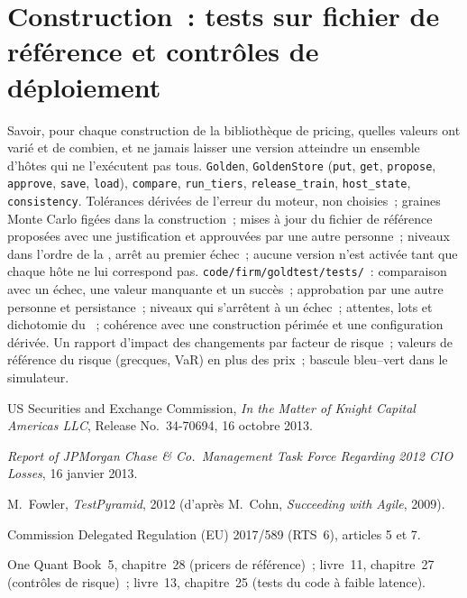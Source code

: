 \section{Construction~: tests sur fichier de référence et contrôles de déploiement}\label{bld:pl:testing-and-continuous-delivery:goldtest}

\begin{build}
 Savoir, pour chaque construction de la bibliothèque de pricing, quelles valeurs ont varié et de combien, et ne jamais laisser une version atteindre un
ensemble d'hôtes qui ne l'exécutent pas tous.
 \texttt{Golden}, \texttt{GoldenStore} (\texttt{put}, \texttt{get}, \texttt{propose}, \texttt{approve}, \texttt{save},
\texttt{load}), \texttt{compare}, \texttt{run\_tiers}, \texttt{release\_train}, \texttt{host\_state}, \texttt{consistency}.
 Tolérances dérivées de l'erreur du moteur, non choisies~; graines Monte Carlo figées dans la construction~; mises à jour du fichier de référence proposées avec une justification
et approuvées par une autre personne~; niveaux dans l'ordre de la , arrêt au premier échec~; aucune version n'est activée tant que chaque hôte ne lui correspond pas.
 \texttt{code/firm/goldtest/tests/}~: comparaison avec un échec, une valeur manquante et un succès~; approbation par une autre
personne et persistance~; niveaux qui s'arrêtent à un échec~; attentes, lots et dichotomie du ~; cohérence avec une construction périmée et une
configuration dérivée.
 Un rapport d'impact des changements par facteur de risque~; valeurs de référence du risque (grecques, VaR) en plus des prix~; bascule bleu--vert dans le
simulateur.
\end{build}

\begin{omsources}
\item US Securities and Exchange Commission, \emph{In the Matter of Knight Capital Americas LLC}, Release No.~34-70694, 16 octobre 2013.
\item \emph{Report of JPMorgan Chase \& Co.\ Management Task Force Regarding 2012 CIO Losses}, 16 janvier 2013.
\item M.~Fowler, \emph{TestPyramid}, 2012 (d'après M.~Cohn, \emph{Succeeding with Agile}, 2009).
\item Commission Delegated Regulation (EU) 2017/589 (RTS~6), articles 5 et 7.
\item One Quant Book~5, chapitre~28 (pricers de référence)~; livre~11, chapitre~27 (contrôles de risque)~; livre~13, chapitre~25 (tests du code à faible latence).
\end{omsources}

